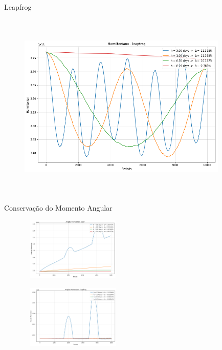 \documentclass{beamer}
\begin{document}
    \begin{frame}{Leapfrog}

      \begin{figure}[h]
        \vspace{-0.5cm}
        \includegraphics[width=100mm, height = 90mm]{resources/h_leap.png}
      \end{figure}

    \end{frame}

    \begin{frame}{Conservação do Momento Angular}

      \begin{figure}[h]
        \vspace{-0.5cm}
        \includegraphics[width=50mm, height = 30mm]{resources/an_euler.png}
      \end{figure}

      \begin{figure}[h]
        \vspace{-0.5cm}
        \includegraphics[width=50mm, height = 30mm]{resources/an_leap.png}
      \end{figure}

    \end{frame}
\end{document}
